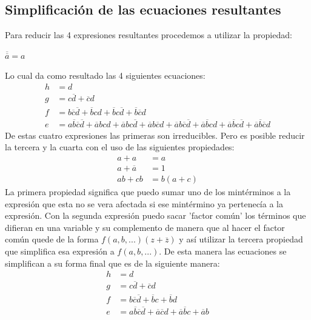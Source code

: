 \subsection{Simplificación de las ecuaciones resultantes}
\hspace{10mm} Para reducir las 4 expresiones resultantes procedemos a utilizar la propiedad:
\newline \centerline{$\overline{\overline{a}}=a$}
Lo cual da como resultado las 4 siguientes ecuaciones:
\begin{align*}
	h & = d                                                                                                                                                                                                                                                        \\
	g & = c\overline{d}+\overline{c}d                                                                                                                                                                                                                              \\
	f & = b\overline{c}\overline{d}+\overline{b}cd+\overline{b}c\overline{d}+\overline{b}\overline{c}d                                                                                                                                                             \\
	e & = a\overline{b}\overline{c}\overline{d}+\overline{a}bcd+\overline{a}bc\overline{d}+\overline{a}b\overline{c}d+\overline{a}b\overline{c}\overline{d}+\overline{a}\overline{b}cd+\overline{a}\overline{b}c\overline{d}+\overline{a}\overline{b}\overline{c}d 
\end{align*}
De estas cuatro expresiones las primeras son irreducibles. Pero es posible reducir la tercera y la cuarta con el uso de las siguientes propiedades:
\begin{align*}
	a+a            & = a      \\
	a+\overline{a} & = 1      \\
	ab+cb          & = b(a+c) 
\end{align*} 
La primera propiedad significa que puedo sumar uno de los mintérminos a la expresión que esta no se vera afectada si ese mintérmino ya pertenecía a la expresión. Con la segunda expresión puedo sacar 'factor común' los términos que difieran en una variable y su complemento de manera que al hacer el factor común quede de la forma $f(a,b,...)(z+\overline{z})$ y así utilizar la tercera propiedad que simplifica esa expresión a $f(a,b,...)$. De esta manera las ecuaciones se simplifican a su forma final que es de la siguiente manera:
\begin{align*}
	h & = d                                                                                                       \\
	g & = c\overline{d}+\overline{c}d                                                                             \\
	f & = b\overline{c}\overline{d}+\overline{b}c+\overline{b}d                                                   \\
	e & = a\overline{b}\overline{c}\overline{d}+\overline{a}\overline{c}d+\overline{a}\overline{b}c+\overline{a}b 
\end{align*}
